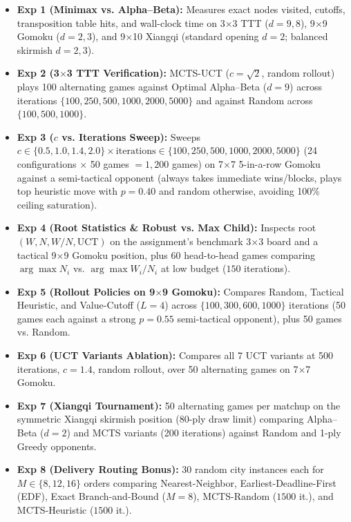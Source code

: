 \documentclass[conference]{IEEEtran}
\begin{document}
\begin{itemize}
    \item \textbf{Exp 1 (Minimax vs. Alpha--Beta):} Measures exact nodes visited, cutoffs, transposition table hits, and wall-clock time on 3$\times$3 TTT ($d=9, 8$), 9$\times$9 Gomoku ($d=2, 3$), and 9$\times$10 Xiangqi (standard opening $d=2$; balanced skirmish $d=2, 3$).
    \item \textbf{Exp 2 (3$\times$3 TTT Verification):} MCTS-UCT ($c=\sqrt{2}$, random rollout) plays 100 alternating games against Optimal Alpha--Beta ($d=9$) across iterations $\{100, 250, 500, 1000, 2000, 5000\}$ and against Random across $\{100, 500, 1000\}$.
    \item \textbf{Exp 3 ($c$ vs. Iterations Sweep):} Sweeps $c \in \{0.5, 1.0, 1.4, 2.0\} \times \text{iterations} \in \{100, 250, 500, 1000, 2000, 5000\}$ (24 configurations $\times$ 50 games $= 1{,}200$ games) on 7$\times$7 5-in-a-row Gomoku against a semi-tactical opponent (always takes immediate wins/blocks, plays top heuristic move with $p=0.40$ and random otherwise, avoiding 100\% ceiling saturation).
    \item \textbf{Exp 4 (Root Statistics \& Robust vs. Max Child):} Inspects root $(W, N, W/N, \text{UCT})$ on the assignment's benchmark 3$\times$3 board and a tactical 9$\times$9 Gomoku position, plus 60 head-to-head games comparing $\arg\max N_i$ vs. $\arg\max W_i/N_i$ at low budget ($150$ iterations).
    \item \textbf{Exp 5 (Rollout Policies on 9$\times$9 Gomoku):} Compares Random, Tactical Heuristic, and Value-Cutoff ($L=4$) across $\{100, 300, 600, 1000\}$ iterations (50 games each against a strong $p=0.55$ semi-tactical opponent), plus 50 games vs. Random.
    \item \textbf{Exp 6 (UCT Variants Ablation):} Compares all 7 UCT variants at 500 iterations, $c=1.4$, random rollout, over 50 alternating games on 7$\times$7 Gomoku.
    \item \textbf{Exp 7 (Xiangqi Tournament):} 50 alternating games per matchup on the symmetric Xiangqi skirmish position (80-ply draw limit) comparing Alpha--Beta ($d=2$) and MCTS variants (200 iterations) against Random and 1-ply Greedy opponents.
    \item \textbf{Exp 8 (Delivery Routing Bonus):} 30 random city instances each for $M \in \{8, 12, 16\}$ orders comparing Nearest-Neighbor, Earliest-Deadline-First (EDF), Exact Branch-and-Bound ($M=8$), MCTS-Random ($1500$ it.), and MCTS-Heuristic ($1500$ it.).
\end{itemize}
\end{document}
